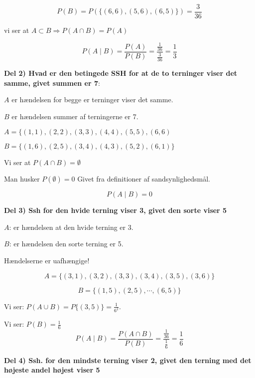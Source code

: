 \begin{equation}
    P(B) = P(\{(6,6),(5,6),(6,5)\}) = \frac{3}{36}
\end{equation}

 vi ser at $A\subset B \Rightarrow P(A \cap B) = P(A)$ 

\begin{equation}
    P(A\mid B) = \frac{P (A )}{P(B)} = \frac{\frac{1}{36}}{\frac{3}{36}} = \frac{1}{3}
\end{equation}

\textbf{Del 2) Hvad er den betingede SSH for at de to terninger viser det samme, givet summen er 7}:

$A$ er hændelsen for begge er terninger viser det samme.

$B$ er hændelsen summer af terningerne er 7.

$A = \{(1,1),(2,2),(3,3),(4,4),(5,5),(6,6)$

$B = \{(1,6),(2,5),(3,4),(4,3),(5,2),(6,1)\}$

Vi ser at $P(A\cap B) = \emptyset$

Man husker $P(\emptyset)=0$ Givet fra definitioner af sandsynlighedsmål.

\begin{equation}
    P(A \mid B) = 0
\end{equation}

\textbf{Del 3) Ssh for den hvide terning viser 3, givet den sorte viser 5}

$A$: er hændelsen at den hvide terning er 3.

$B$: er hændelsen den sorte terning er 5.

Hændelserne er uafhængige!

\begin{equation}
    A = \{ (3,1), (3,2), (3,3), (3,4), (3,5), (3,6) \}
\end{equation}

\begin{equation}
    B = \{ (1,5), (2,5), \cdots , (6,5) \}
\end{equation}

Vi ser: $P(A \cup B) = P\{(3, 5)\} = \frac{1}{6^2}$.

Vi ser: $P(B) = \frac{1}{6}$
\begin{equation}
    P(A \mid B) = \frac{P(A \cap B)}{P(B)} = \frac{\frac{1}{36}}{\frac{1}{6}} = \frac{1}{6}
\end{equation}

\textbf{Del 4) Ssh. for den mindste terning viser 2, givet den terning med det højeste andel højest viser 5}

